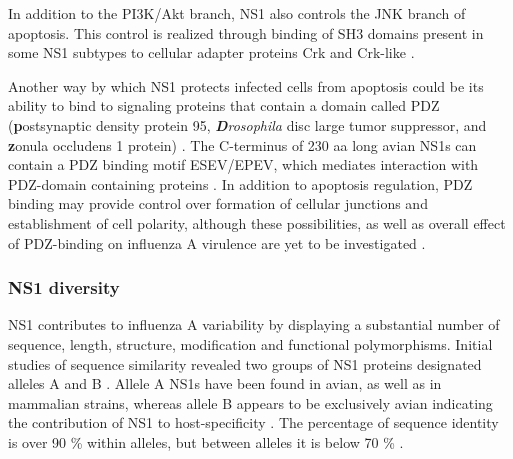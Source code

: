 		In addition to the \gls{PI3K}/Akt branch, \gls{NS1} also controls the \gls{JNK} branch of apoptosis. This control is realized through binding of \gls{SH3} domains present in some \gls{NS1} subtypes to cellular adapter proteins Crk and Crk-like \parencite{Heikkinen2008, Hrincius2010}.
		
		Another way by which \gls{NS1} protects infected cells from apoptosis could be its ability to bind to signaling proteins that contain a domain called PDZ (\textbf{p}ostsynaptic density protein 95, \textit{\textbf{D}rosophila} disc large tumor suppressor, and \textbf{z}onula occludens 1 protein) \parencite{Liu2010}. The C-terminus of 230 \gls{aa} long avian \gls{NS1}s can contain a PDZ binding motif ESEV/EPEV, which mediates interaction with PDZ-domain containing proteins \parencite{Golebiewski2011}. In addition to apoptosis regulation, PDZ binding may provide control over formation of cellular junctions and establishment of cell polarity, although these possibilities, as well as overall effect of PDZ-binding on influenza A virulence are yet to be investigated \parencite{Jackson2010, Zielecki2010, Javier2011}.
		
		
		
		
				
	
		
		
		
		\subsubsection{NS1 diversity} \label{sec:diversity}
		
		NS1 contributes to influenza A variability by displaying a substantial number of sequence, length, structure, modification and functional polymorphisms. Initial studies of sequence similarity revealed two groups of \gls{NS1} proteins designated alleles A and B \parencite{Scholtissek1980}. Allele A \gls{NS1}s have been found in avian, as well as in mammalian strains, whereas allele B appears to be exclusively avian indicating the contribution of NS1 to host-specificity \parencite{Treanor1989, Ludwig1991}. The percentage of sequence identity is over 90 \% within alleles, but between alleles it is below 70 \% \parencite{Scholtissek1980}.
		
